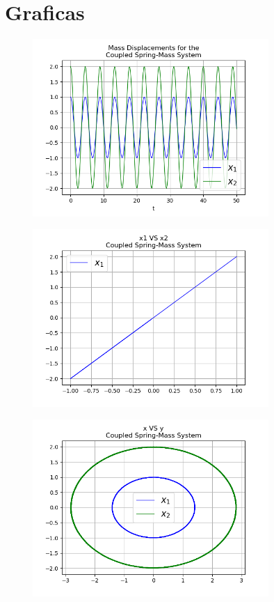 \documentclass{article}
\begin{document}
\section{Graficas}
\begin{figure}[!ht]
\centering
\includegraphics[width=0.8\textwidth]{two_springs1-1.png}
\end{figure}
\begin{figure}[!ht]
\centering
\includegraphics[width=0.8\textwidth]{two_springs1-2.png}
\end{figure}
\begin{figure}[!ht]
\centering
\includegraphics[width=0.8\textwidth]{two_springs1-3.png}
\end{figure}
\end{document}
